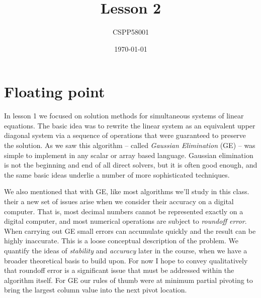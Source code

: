 \documentclass[11pt]{article}
\begin{document}
\title{Lesson 2} 
\author{CSPP58001}
\date{\today}
\maketitle

\section{Floating point}
In lesson 1 we focused on solution methods for simultaneous systems of
linear equations. The basic idea was to rewrite the linear system as
an equivalent upper diagonal system via a sequence of operations that
were guaranteed to preserve the solution. As we saw this algorithm --
called {\em Gaussian Elimination} (GE) -- was simple to implement in
any scalar or array based language. Gaussian elimination is not the
beginning and end of all direct solvers, but it is often good enough,
and the same basic ideas underlie a number of more sophisticated
techniques.

We also mentioned that with GE, like most algorithms we'll study in
this class. their a new set of issues arise when we consider their
accuracy on a digital computer. That is, most decimal numbers cannot
be represented exactly on a digital computer, and most numerical
operations are subject to {\em roundoff error}. When carrying out GE
small errors can accumulate quickly and the result can be highly
inaccurate. This is a loose conceptual description of the problem. We
quantify the ideas of {\em stability} and {\em accuracy} later in the
course, when we have a broader theoretical basis to build upon. For
now I hope to convey qualitatively that roundoff error is a
significant issue that must be addressed within the algorithm
itself. For GE our rules of thumb were at minimum partial pivoting to
bring the largest column value into the next pivot location.
\end{document}

